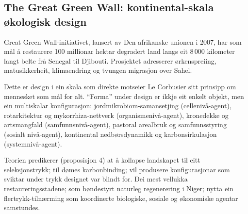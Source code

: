 \subsection{The Great Green Wall: kontinental-skala økologisk design}

Great Green Wall-initiativet, lansert av Den afrikanske unionen i 2007, har som mål å restaurere 100 millionar hektar degradert land langs eit 8\,000 kilometer langt belte frå Senegal til Djibouti. Prosjektet adresserer ørkenspreiing, matusikkerheit, klimaendring og tvungen migrasjon over Sahel.

Dette er design i ein skala som direkte motseier Le Corbusier sitt prinsipp om mennesket som mål for alt. ``Forma'' under design er ikkje eit enkelt objekt, men ein multiskalar konfigurasjon: jordmikrobiom-samansetjing (cellenivå-agent), rotarkitektur og mykorrhiza-nettverk (organismenivå-agent), kronedekke og artsmangfald (samfunnsnivå-agent), pastoral arealbruk og samfunnsstyring (sosialt nivå-agent), kontinental nedbørsdynamikk og karbonsirkulasjon (systemnivå-agent).

Teorien predikerer (proposisjon 4) at å kollapse landskapet til eitt seleksjonstrykk; til dømes karbonbinding; vil produsere konfigurasjonar som sviktar under trykk designet var blindt for. Dei mest vellukka restaureringsstadene; som bøndestyrt naturleg regenerering i Niger; nytta ein flertrykk-tilnærming som koordinerte biologiske, sosiale og økonomiske agentar samstundes.
